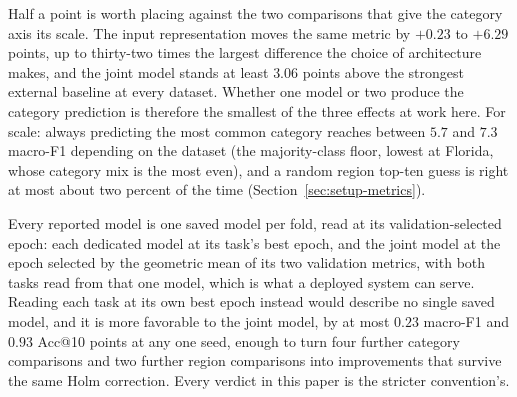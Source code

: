 Half a point is worth placing against the two comparisons that give the category axis its scale. The
input representation moves the same metric by $+0.23$ to $+6.29$ points, up to thirty-two times the
largest difference the choice of architecture makes, and the joint model stands at least $3.06$ points
above the strongest external baseline at every dataset. Whether one model or two produce the category
prediction is therefore the smallest of the three effects at work here.
For scale: always predicting the most common category reaches between $5.7$ and $7.3$ macro-F1
depending on the dataset (the majority-class floor, lowest at Florida, whose category mix is the
most even), and a random region top-ten guess is right at most about two percent of the time
(Section~\ref{sec:setup-metrics}).

Every reported model is one saved model per fold, read at its validation-selected epoch: each
dedicated model at its task's best epoch, and the joint model at the epoch selected by the geometric
mean of its two validation metrics, with both tasks read from that one model, which is what a
deployed system can serve. Reading each task at its own best epoch instead would describe no single
saved model, and it is more favorable to the joint model, by at most $0.23$ macro-F1 and $0.93$
Acc@10 points at any one seed, enough to turn four further category comparisons and two further
region comparisons into improvements that survive the same Holm correction. Every verdict in this
paper is the stricter convention's.

